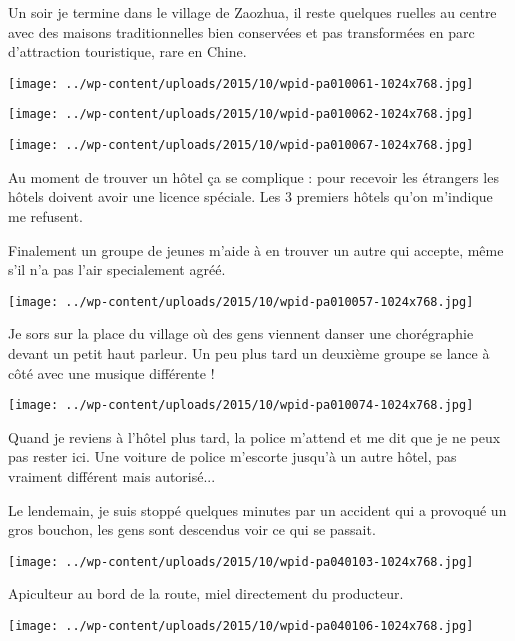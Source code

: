   Un soir je termine dans le village de Zaozhua, il reste quelques ruelles au centre avec des maisons traditionnelles bien conservées et pas transformées en parc d'attraction touristique, rare en Chine. 
\begin{center} \texttt{[image: ../wp-content/uploads/2015/10/wpid-pa010061-1024x768.jpg]} \end{center}
\begin{center} \texttt{[image: ../wp-content/uploads/2015/10/wpid-pa010062-1024x768.jpg]} \end{center}
\begin{center} \texttt{[image: ../wp-content/uploads/2015/10/wpid-pa010067-1024x768.jpg]} \end{center}

 Au moment de trouver un hôtel ça se complique : pour recevoir les étrangers les hôtels doivent avoir une licence spéciale. Les 3 premiers hôtels qu'on m'indique me refusent. 

 Finalement un groupe de jeunes m'aide à en trouver un autre qui accepte, même s'il n'a pas l'air specialement agréé.
 \begin{center} \texttt{[image: ../wp-content/uploads/2015/10/wpid-pa010057-1024x768.jpg]} \end{center}
\vspace{-\topsep}
\pagebreak
 
 Je sors sur la place du village où des gens viennent danser une chorégraphie devant un petit haut parleur. Un peu plus tard un deuxième groupe se lance à côté avec une musique différente ! 
\begin{center} \texttt{[image: ../wp-content/uploads/2015/10/wpid-pa010074-1024x768.jpg]} \end{center}

 Quand je reviens à l'hôtel plus tard, la police m'attend et me dit que je ne peux pas rester ici. Une voiture de police m'escorte jusqu'à un autre hôtel, pas vraiment différent mais autorisé...

  Le lendemain, je suis stoppé quelques minutes par un accident qui a provoqué un gros bouchon, les gens sont descendus voir ce qui se passait. 
\begin{center} \texttt{[image: ../wp-content/uploads/2015/10/wpid-pa040103-1024x768.jpg]} \end{center}

 Apiculteur au bord de la route, miel directement du producteur. 
 \vspace{-2mm}
\begin{center} \texttt{[image: ../wp-content/uploads/2015/10/wpid-pa040106-1024x768.jpg]} \end{center}


